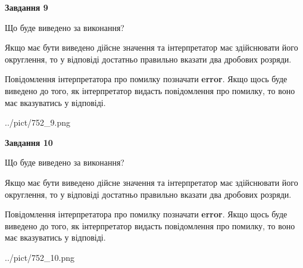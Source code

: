 \documentclass[12pt, ukrainian]{article}
\begin{document}
{\begin {Large}
{\begin {center}\textbf{Завдання 9}\end {center}}\par
Що буде виведено за виконання? \par

Якщо має бути виведено дійсне значення та інтерпретатор має здійснювати його округлення, 
то у відповіді достатньо правильно вказати два дробових розряди.

Повідомлення інтерпретатора про помилку позначати \textbf{error}.
Якщо щось буде виведено до того, як інтерпретатор видасть повідомлення про помилку, 
то воно має вказуватись у відповіді. \par

\begin{center}
	{../pict/752_9.png}
\end{center}
\newpage

{\begin {center}\textbf{Завдання 10}\end {center}}\par
Що буде виведено за виконання? \par

Якщо має бути виведено дійсне значення та інтерпретатор має здійснювати його округлення, 
то у відповіді достатньо правильно вказати два дробових розряди.

Повідомлення інтерпретатора про помилку позначати \textbf{error}.
Якщо щось буде виведено до того, як інтерпретатор видасть повідомлення про помилку, 
то воно має вказуватись у відповіді. \par

\begin{center}
	{../pict/752_10.png}
\end{center}
\newpage

\end {Large}}
\end{document}
